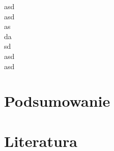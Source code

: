 \documentclass[11pt]{article}
\begin{document}
asd\\
asd\\
as\\
da\\
sd\\
asd\\
asd\\
\begin{figure}[ht]
\end{figure}
\section{Podsumowanie}
\section{Literatura}
\end{document}
